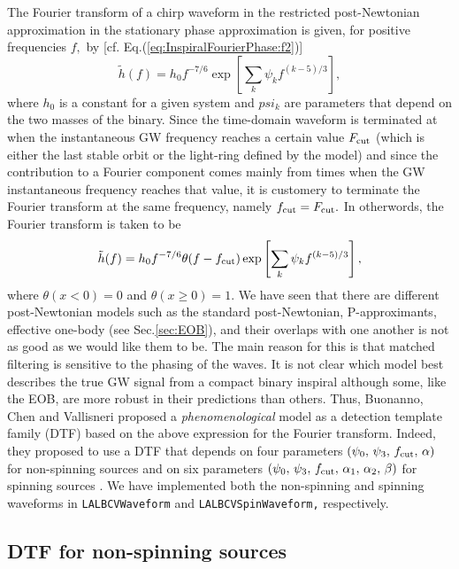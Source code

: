  The Fourier transform of a chirp waveform in the restricted post-Newtonian
 approximation in the stationary phase approximation is given, for
 positive frequencies $f,$ by [cf. Eq.(\ref{eq:InspiralFourierPhase:f2})]
 \begin{equation}
 \tilde h(f) = h_0 f^{-7/6} \exp \left [ \sum_k \psi_k f^{(k-5)/3} \right ],
 \end{equation}
 where $h_0$ is a constant for a given system and $psi_k$ are parameters that
 depend on the two masses of the binary. Since the time-domain waveform
 is terminated at when the instantaneous GW frequency reaches a certain value
 $F_{\rm cut}$ (which is either the last stable
 orbit or the light-ring defined by the model) and since the contribution to
 a Fourier component comes mainly from times when the GW instantaneous frequency
 reaches that value, it is customery to terminate the Fourier transform at the
 same frequency, namely $f_{\rm cut} = F_{\rm cut}.$ In otherwords, the Fourier
 transform is taken to be
 \begin{equation}
 \tilde h(f) = h_0 f^{-7/6} \theta(f-f_{\rm cut}) \exp \left [ \sum_k \psi_k f^{(k-5)/3} \right ],
 \end{equation}
 where $\theta(x<0)=0$ and $\theta(x\ge 0) =1.$
 We have seen that there are different post-Newtonian models such as the
 standard post-Newtonian,
 P-approximants, effective one-body (see Sec.\ref{sec:EOB}),
 and their overlaps with one another is not
 as good as we would like them to be. The main reason for this is that matched
 filtering is sensitive to the phasing of the waves. It is not clear which model
 best describes the true GW signal from a compact binary inspiral although some,
 like the EOB, are more robust in their predictions than others. Thus, Buonanno,
 Chen and Vallisneri proposed \cite{BCV03,BCV03b}
a {\it phenomenological} model as a detection template
 family (DTF) based on the above expression for the Fourier transform. Indeed, they
 proposed to use a DTF that depends on four parameters
$(\psi_0,\, \psi_3,\, f_{\rm cut},\, \alpha)$ for non-spinning sources \cite{BCV03}
and on six parameters
$(\psi_0,\, \psi_3,\, f_{\rm cut},\, \alpha_1,\, \alpha_2,\, \beta)$
for spinning sources \cite{BCV03b}.
We have implemented both the non-spinning and spinning waveforms
in \texttt{LALBCVWaveform} and \texttt{LALBCVSpinWaveform,} respectively.

\subsection{DTF for non-spinning sources}

